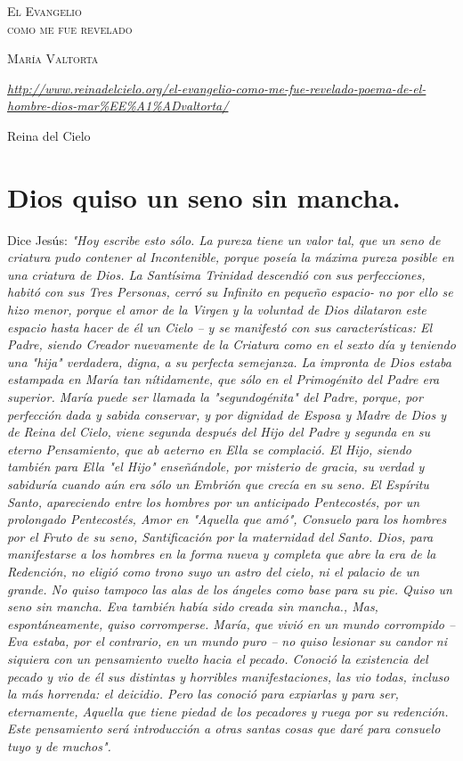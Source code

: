 \documentclass[12pt]{book} %
\begin{document}
\begin{titlepage}
\centering
\vspace{3.5cm}
{\scshape\LARGE El Evangelio\\como me fue revelado \par}
\vfill
{\scshape\Large María Valtorta \par}
\vfill
{\itshape \url{http://www.reinadelcielo.org/el-evangelio-como-me-fue-revelado-poema-de-el-hombre-dios-mar%EE%A1%ADvaltorta/} \par}
\vfill
Reina del Cielo
\end{titlepage}

\frenchspacing
\chapter*{Dios quiso un seno sin mancha.}

Dice Jesús: 
\emph{"Hoy escribe esto sólo. La pureza tiene un valor tal, que un seno de criatura pudo contener al Incontenible, porque poseía la máxima pureza posible en una criatura de Dios. La Santísima Trinidad descendió con sus perfecciones, habitó con sus Tres Personas, cerró su Infinito en pequeño espacio- no por ello se hizo menor, porque el amor de la Virgen y la voluntad de Dios dilataron este espacio hasta hacer de él un Cielo – y se manifestó con sus características: El Padre, siendo Creador nuevamente de la Criatura como en el sexto día y teniendo una "hija" verdadera, digna, a su perfecta semejanza. La impronta de Dios estaba estampada en María tan nítidamente, que sólo en el Primogénito del Padre era superior. María puede ser llamada la "segundogénita" del Padre, porque, por perfección dada y sabida conservar, y por dignidad de Esposa y Madre de Dios y de Reina del Cielo, viene segunda después del Hijo del Padre y segunda en su eterno Pensamiento, que ab aeterno en Ella se complació. El Hijo, siendo también para Ella "el Hijo" enseñándole, por misterio de gracia, su verdad y sabiduría cuando aún era sólo un Embrión que crecía en su seno. El Espíritu Santo, apareciendo entre los hombres por un anticipado Pentecostés, por un prolongado Pentecostés, Amor en "Aquella que amó", Consuelo para los hombres por el Fruto de su seno, Santificación por la maternidad del Santo. Dios, para manifestarse a los hombres en la forma nueva y completa que abre la era de la Redención, no eligió como trono suyo un astro del cielo, ni el palacio de un grande. No quiso tampoco las alas de los ángeles como base para su pie. Quiso un seno sin mancha. Eva también había sido creada sin mancha., Mas, espontáneamente, quiso corromperse. María, que vivió en un mundo corrompido – Eva estaba, por el contrario, en un mundo puro – no quiso lesionar su candor ni siquiera con un pensamiento vuelto hacia el pecado. Conoció la existencia del pecado y vio de él sus distintas y horribles manifestaciones, las vio todas, incluso la más horrenda: el deicidio. Pero las conoció para expiarlas y para ser, eternamente, Aquella que tiene piedad de los pecadores y ruega por su redención. Este pensamiento será introducción a otras santas cosas que daré para consuelo tuyo y de muchos".}
 
\end{document}
